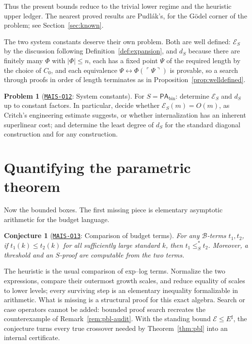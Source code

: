 \documentclass[11pt]{amsart}
\newcommand{\Oid}[1]{\href{https://github.com/lionellevine/MAIS/blob/main/open-problems/MAIS-O#1.md}{\texttt{MAIS-O#1}}}
\theoremstyle{plain}
\newtheorem{conjecture}[theorem]{Conjecture}
\theoremstyle{definition}
\newtheorem{problem}[theorem]{Problem}
\newcommand{\PAbin}{\mathsf{PA}_{\mathrm{bin}}}
\newcommand{\gn}[1]{\ulcorner #1 \urcorner}
\newcommand{\Bud}{\mathcal{B}}
\newcommand{\leSstar}{\mathrel{\leq_S^{*}}}
\begin{document}
Thus the present bounds reduce to the trivial lower regime and the heuristic upper ledger. The nearest proved results are Pudl\'ak's, for the G\"odel corner of the problem; see Section~\ref{sec:known}.

The two system constants deserve their own problem. Both are well defined: $\mathcal{E}_S$ by the discussion following Definition~\ref{def:expansion}, and $d_S$ because there are finitely many $\Phi$ with $|\Phi| \le n$, each has a fixed point $\Psi$ of the required length by the choice of $C_0$, and each equivalence $\Psi \leftrightarrow \Phi(\gn{\Psi})$ is provable, so a search through proofs in order of length terminates as in Proposition~\ref{prop:welldefined}.

\begin{problem}[\Oid{12}: System constants]
\label{prob:expansion}
For $S = \PAbin$: determine $\mathcal{E}_S$ and $d_S$ up to constant factors. In particular, decide whether $\mathcal{E}_S(m) = O(m)$, as Critch's engineering estimate suggests, or whether internalization has an inherent superlinear cost; and determine the least degree of $d_S$ for the standard diagonal construction and for any construction.
\end{problem}

\section{Quantifying the parametric theorem}
\label{sec:parametric}

Now the bounded boxes. The first missing piece is elementary asymptotic arithmetic for the budget language.

\begin{conjecture}[\Oid{13}: Comparison of budget terms]
\label{conj:comparison}
For any $\Bud$-terms $t_1,t_2$, if $t_1(k)\le t_2(k)$ for all sufficiently large standard $k$, then $t_1\leSstar t_2$. Moreover, a threshold and an $S$-proof are computable from the two terms.
\end{conjecture}

The heuristic is the usual comparison of exp--log terms. Normalize the two expressions, compare their outermost growth scales, and reduce equality of scales to lower levels; every surviving step is an elementary inequality formalizable in arithmetic. What is missing is a structural proof for this exact algebra. Search or case operators cannot be added: bounded proof search recreates the counterexample of Remark~\ref{rem:pbl-audit}. With the standing bound $\mathcal E\le E^\sharp$, the conjecture turns every true crossover needed by Theorem~\ref{thm:pbl} into an internal certificate.
\end{document}
